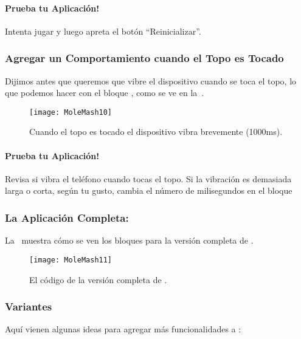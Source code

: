 {\paragraph{Prueba tu Aplicación!} Intenta jugar y luego apreta el
botón ``Reinicializar''.

\subsubsection*{Agregar un Comportamiento cuando el Topo es Tocado}

Dijimos antes que queremos que vibre el dispositivo cuando se toca el
topo, lo que podemos hacer con el bloque , como
se ve en la~.

\begin{figure}[H]
\centering
\texttt{[image: MoleMash10]}
\caption{Cuando el topo es tocado el dispositivo vibra brevemente
  (1000ms).}
\label{fig:MoleMash10}
\end{figure}

\paragraph{Prueba tu Aplicación!}{Revisa si vibra el teléfono cuando tocas el topo. Si
la vibración es demasiada larga o corta, según tu gusto, cambia el
número de milisegundos en el bloque 

\subsubsection*{La Aplicación Completa: }

La~ muestra cómo se ven los bloques para la
versión completa de .

\begin{figure}[H]
\vspace{3em}
\centering
\texttt{[image: MoleMash11]}
\caption{El código de la versión completa de .}
\label{fig:MoleMash11}
\end{figure}

\subsubsection*{Variantes}

Aquí vienen algunas ideas para agregar más funcionalidades a
:

}}
